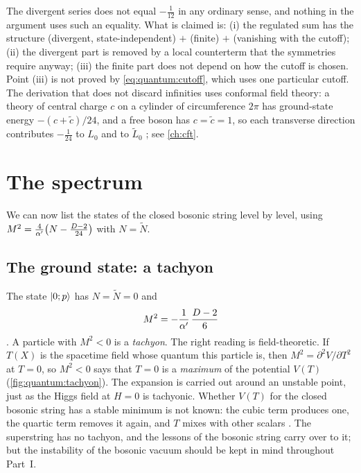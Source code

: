 \begin{pitfallbox}[Common pitfall: ``$1+2+3+\dots=-\frac1{12}$'']
The divergent series does not equal $-\frac1{12}$ in any ordinary sense, and nothing in the
argument uses such an equality. What is claimed is: (i) the regulated sum has the structure
(divergent, state-independent) $+$ (finite) $+$ (vanishing with the cutoff); (ii) the
divergent part is removed by a local counterterm that the symmetries require anyway; (iii)
the finite part does not depend on how the cutoff is chosen. Point (iii) is not proved by
\cref{eq:quantum:cutoff}, which uses one particular cutoff. The derivation that does not
discard infinities uses conformal field theory: a theory of central charge $c$ on a cylinder
of circumference $2\pi$ has ground-state energy $-(c+\tilde c)/24$, and a free boson has
$c=\tilde c=1$, so each transverse direction contributes $-\frac1{24}$ to $L_0$ and to
$\tilde L_0$ ; see \cref{ch:cft}.
\end{pitfallbox}

\section{The spectrum}\label{sec:quantum:spectrum}

We can now list the states of the closed bosonic string level by level, using
$M^2=\frac4{\alpha'}\big(N-\frac{D-2}{24}\big)$ with $N=\tilde N$.

\subsection{The ground state: a tachyon}

The state $|0;p\rangle$ has $N=\tilde N=0$ and
\begin{equation}\label{eq:quantum:tachyon}
 M^2=-\frac{1}{\alpha'}\,\frac{D-2}{6}
\end{equation}
. A particle with $M^2<0$ is a
\emph{tachyon}. The right reading is field-theoretic. If $T(X)$ is the
spacetime field whose quantum this particle is, then $M^2=\partial^2V/\partial T^2$ at
$T=0$, so $M^2<0$ says that $T=0$ is a \emph{maximum} of the potential $V(T)$
(\cref{fig:quantum:tachyon}). The expansion is carried out around an unstable point, just as
the Higgs field at $H=0$ is tachyonic. Whether $V(T)$ for the closed bosonic string has a
stable minimum is not known: the cubic term produces one, the quartic term removes it again,
and $T$ mixes with other scalars . The superstring has no
tachyon, and the lessons of the bosonic string carry over to it; but the instability of the
bosonic vacuum should be kept in mind throughout Part~I.

